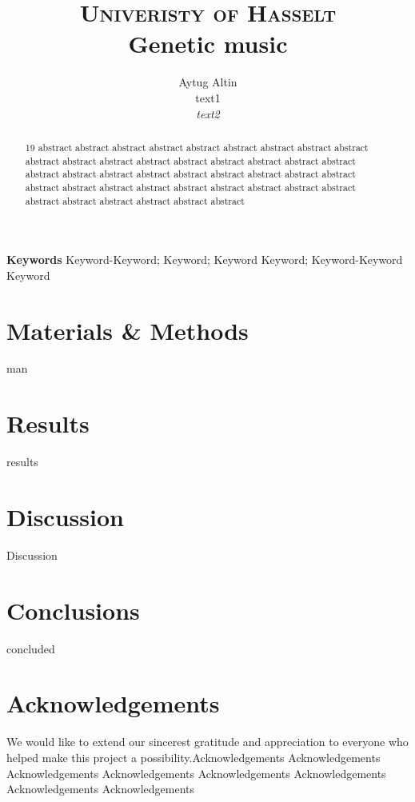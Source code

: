 \documentclass[10pt,twocolumn,letterpaper]{article}
\title{
		\usefont{OT1}{bch}{b}{n}
		\normalfont \normalsize \textsc{Univeristy of Hasselt} \\ [10pt]
		\huge Genetic music\\
}
\author[0]{Aytug Altin \\
		text1 \\
        \textit{text2}}
\begin{document}
\maketitle
{}
\begin{abstract}
	  19 abstract abstract abstract abstract abstract abstract abstract abstract abstract abstract abstract abstract abstract abstract abstract abstract abstract abstract abstract abstract abstract abstract abstract abstract abstract abstract abstract abstract abstract abstract abstract abstract abstract abstract abstract abstract abstract abstract abstract abstract abstract abstract
\end{abstract}
{\textbf{Keywords}
Keyword-Keyword; Keyword; Keyword Keyword; Keyword-Keyword Keyword}





\section*{Materials \& Methods}
man
\section*{Results}
results

 

\section*{Discussion}
Discussion



\section*{Conclusions}
concluded


\section*{Acknowledgements}
We would like to extend our sincerest gratitude and appreciation to everyone who helped make this project a possibility.Acknowledgements Acknowledgements Acknowledgements Acknowledgements Acknowledgements Acknowledgements Acknowledgements Acknowledgements


{}
\end{document}
